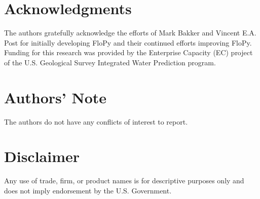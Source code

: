 \documentclass[12pt, oneside]{article}  	%
\begin{document}
\section*{Acknowledgments}
The authors gratefully acknowledge the efforts of Mark Bakker and Vincent E.A. Post for initially developing FloPy and their continued efforts improving FloPy. Funding for this research was provided by the Enterprise Capacity (EC) project of the U.S. Geological Survey Integrated Water Prediction program.

\section*{Authors' Note}
The authors do not have any conflicts of interest to report.

\section*{Disclaimer}
Any use of trade, firm, or product names is for descriptive purposes only and does not imply endorsement by the U.S. Government.



\end{document}
